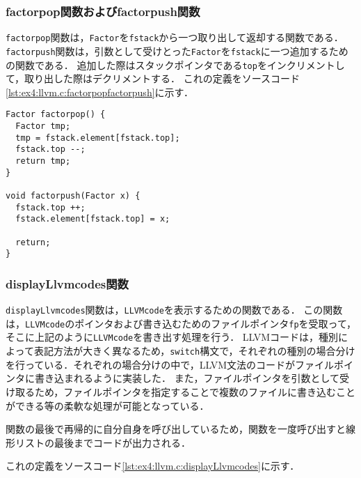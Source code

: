 \documentclass[uplatex]{jsarticle}
\begin{document}
\subsubsection{factorpop関数およびfactorpush関数}
\verb#factorpop#関数は，\verb#Factor#を\verb#fstack#から一つ取り出して返却する関数である．
\verb#factorpush#関数は，引数として受けとった\verb#Factor#を\verb#fstack#に一つ追加するための関数である．
追加した際はスタックポインタである\verb#top#をインクリメントして，取り出した際はデクリメントする．
これの定義をソースコード\ref{lst:ex4:llvm.c:factorpopfactorpush}に示す．
\begin{lstlisting}[caption=factorpop関数およびfactorpush関数の定義,label=lst:ex4:llvm.c:factorpopfactorpush]
Factor factorpop() {
  Factor tmp;
  tmp = fstack.element[fstack.top];
  fstack.top --;
  return tmp;
}

void factorpush(Factor x) {
  fstack.top ++;
  fstack.element[fstack.top] = x;

  return;
}
\end{lstlisting}

\subsubsection{displayLlvmcodes関数}
\verb#displayLlvmcodes#関数は，\verb#LLVMcode#を表示するための関数である．
この関数は，\verb#LLVMcode#のポインタおよび書き込むためのファイルポインタ\verb#fp#を受取って，そこに上記のように\verb#LLVMcode#を書き出す処理を行う．
LLVMコードは，種別によって表記方法が大きく異なるため，\verb#switch#構文で，それぞれの種別の場合分けを行っている．それぞれの場合分けの中で，LLVM文法のコードがファイルポインタに書き込まれるように実装した．
また，ファイルポインタを引数として受け取るため，ファイルポインタを指定することで複数のファイルに書き込むことができる等の柔軟な処理が可能となっている．

関数の最後で再帰的に自分自身を呼び出しているため，関数を一度呼び出すと線形リストの最後までコードが出力される．

これの定義をソースコード\ref{lst:ex4:llvm.c:displayLlvmcodes}に示す．
\end{document}
